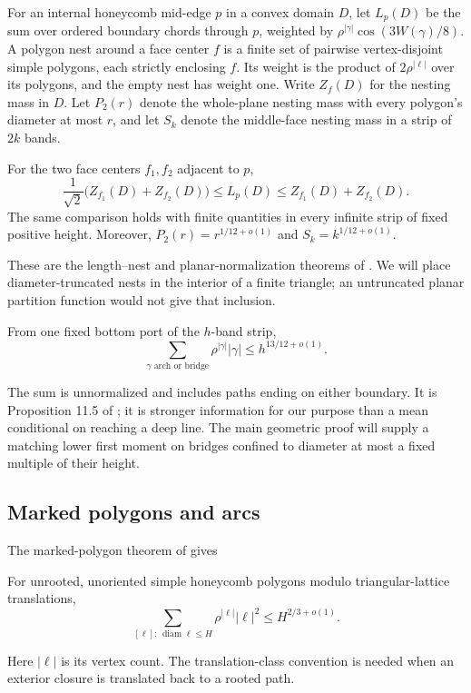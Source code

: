 For an internal honeycomb mid-edge \(p\) in a convex domain \(D\),
let \(L_p(D)\) be the sum over ordered boundary chords through \(p\),
weighted by \(\rho^{|\gamma|}\cos(3W(\gamma)/8)\). A polygon nest
around a face center \(f\) is a finite set of pairwise vertex-disjoint
simple polygons, each strictly enclosing \(f\). Its weight is the
product of \(2\rho^{|\ell|}\) over its polygons, and the empty nest
has weight one. Write \(Z_f(D)\) for the nesting mass in \(D\).
Let \(P_2(r)\) denote the whole-plane nesting mass with every polygon's
diameter at most \(r\), and let \(S_k\) denote the middle-face nesting
mass in a strip of \(2k\) bands.
\begin{theorem}\label{lem:02-length-nests}\label{thm:05-nest-normalization}
For the two face centers \(f_1,f_2\) adjacent to \(p\),
\[
 \frac1{\sqrt2}\bigl(Z_{f_1}(D)+Z_{f_2}(D)\bigr)
 \le L_p(D)\le Z_{f_1}(D)+Z_{f_2}(D).
\]
The same comparison holds with finite quantities in every infinite strip
of fixed positive height. Moreover,
\(P_2(r)=r^{1/12+o(1)}\) and \(S_k=k^{1/12+o(1)}\).
\end{theorem}
These are the length--nest and planar-normalization theorems of
\cite[Lemma 11.4, Theorem 11.2 and Corollary 11.3]{CylinderCompanion}. We will place diameter-truncated nests in the
interior of a finite triangle; an untruncated planar partition function
would not give that inclusion.
\begin{theorem}\label{prop:02-length-reduction}
From one fixed bottom port of the \(h\)-band strip,
\[
 \sum_{\gamma\text{ arch or bridge}}\rho^{|\gamma|}|\gamma|
       \le h^{13/12+o(1)}.
\]
\end{theorem}
The sum is unnormalized and includes paths ending on either boundary.
It is Proposition 11.5 of \cite{CylinderCompanion}; it is
stronger information for our purpose than a mean conditional on reaching
a deep line. The main geometric proof will supply a matching lower
first moment on bridges confined to diameter at most a fixed multiple
of their height.

\subsection{Marked polygons and arcs}
The marked-polygon theorem of \cite[Theorem 1.1]{MarkedCompanion} gives
\begin{theorem}\label{thm:07_magnetic_analysis-moment}
For unrooted, unoriented simple honeycomb polygons modulo triangular-lattice
translations,
\[
 \sum_{[\ell]:\,\operatorname{diam}\ell\le H}
             \rho^{|\ell|}|\ell|^2\le H^{2/3+o(1)}.
\]
\end{theorem}
Here \(|\ell|\) is its vertex count. The translation-class convention
is needed when an exterior closure is translated back to a rooted path.


